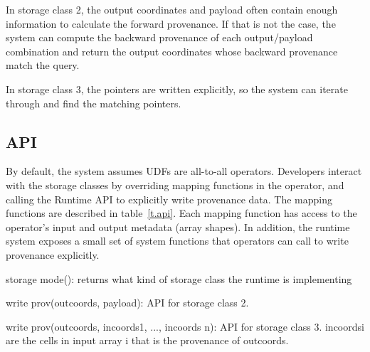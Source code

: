In storage class 2, the output coordinates and payload often contain enough information to calculate the forward provenance. If that is not the case, the system can compute the backward provenance of each output/payload combination and return the output coordinates whose backward provenance match the query.

In storage class 3, the pointers are written explicitly, so the system can iterate through and find the matching pointers.




\subsection{API}

By default, the system assumes UDFs are all-to-all operators. Developers interact with the storage classes by overriding mapping functions in the operator, and calling the Runtime API to explicitly write provenance data.
The mapping functions are described in table~\ref{t.api}. Each mapping function has access to the operator’s input and output metadata (array shapes).
In addition, the runtime system exposes a small set of system functions that operators can call to write provenance explicitly.
\begin{CompactEnumerate}
\item storage mode(): returns what kind of storage class the runtime is implementing
\item write prov(outcoords, payload): API for storage class 2.
\item write prov(outcoords, incoords1, ..., incoords n): API for storage class 3. incoordsi are the cells in input array i that is the provenance of outcoords.
\end{CompactEnumerate}




